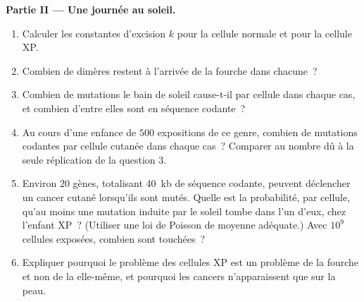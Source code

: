\begin{problem}
\medskip
\noindent\textbf{Partie II --- Une journée au soleil.}
\begin{enumerate}[resume]
  \item Calculer les constantes d'excision $k$ pour la cellule normale
        et pour la cellule XP.
  \item Combien de dimères restent à l'arrivée de la fourche dans
        chacune~?
  \item Combien de mutations le bain de soleil cause-t-il par cellule
        dans chaque cas, et combien d'entre elles sont en séquence
        codante~?
  \item Au cours d'une enfance de $500$ expositions de ce genre,
        combien de mutations codantes par cellule cutanée dans chaque
        cas~? Comparer au nombre dû à la seule réplication de la
        question 3.
  \item Environ $20$ gènes, totalisant \qty{40}{kb} de séquence
        codante, peuvent déclencher un cancer cutané lorsqu'ils sont
        mutés. Quelle est la probabilité, par cellule, qu'au moins une
        mutation induite par le soleil tombe dans l'un d'eux, chez
        l'enfant XP~? (Utiliser une loi de Poisson de moyenne
        adéquate.) Avec $10^{9}$ cellules exposées, combien sont
        touchées~?
  \item Expliquer pourquoi le problème des cellules XP est un problème
        de la fourche et non de la  elle-même, et pourquoi les
        cancers n'apparaissent que sur la peau.
\end{enumerate}


\end{problem}
